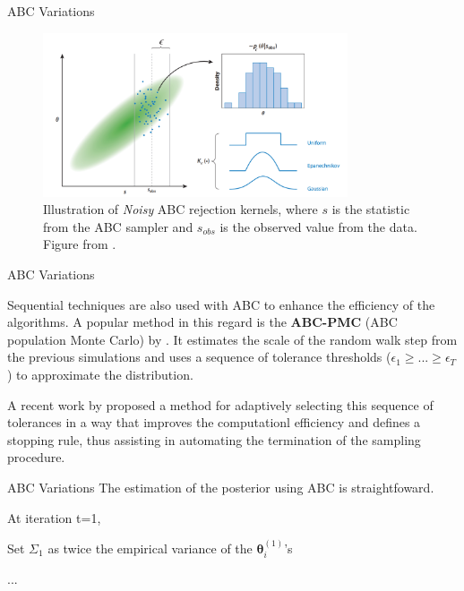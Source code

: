 \documentclass[10pt]{beamer}
\begin{document}
\begin{frame}[fragile]{ABC Variations}

    \begin{figure}[H]
        \centering
        \includegraphics[width=9cm]{images/NoisyABC.png}
        \caption{
        Illustration of \textit{Noisy} ABC rejection kernels, where
        $s$ is the statistic from the ABC sampler and $s_{obs}$ is 
        the observed value from the data.
        Figure from \cite{Beaumont2018}.
        }
    \end{figure}

\end{frame}

\begin{frame}[fragile]{ABC Variations}

  Sequential techniques are also used with ABC to enhance the
  efficiency of the algorithms. A popular method in this regard is
  the \textbf{ABC-PMC}
  (ABC population Monte Carlo) by \citet{Beaumont2009}.
  It estimates the scale of the random walk step from the previous
  simulations and
  uses a sequence of tolerance thresholds
  ($\epsilon_1 \geq ... \geq \epsilon_T$) to approximate the distribution.

   A recent work by \citet{Simola2019} proposed a method
   for adaptively selecting this sequence of tolerances in a way that
   improves the computationl efficiency and defines a stopping rule,
   thus assisting in automating the termination of the sampling
   procedure.
\end{frame}

\begin{frame}[fragile]{ABC Variations}
  The estimation of the posterior using ABC is straightfoward.

  \footnotesize
  \begin{algorithm}[H]
  \SetAlgoLined
  At iteration t=1,

  Set $\Sigma_1$ as twice the empirical variance of the
  $\bm \theta_i^{(1)}$'s

  ...

   \caption{ABC-PMC}
  \end{algorithm}

\end{frame}
\end{document}
